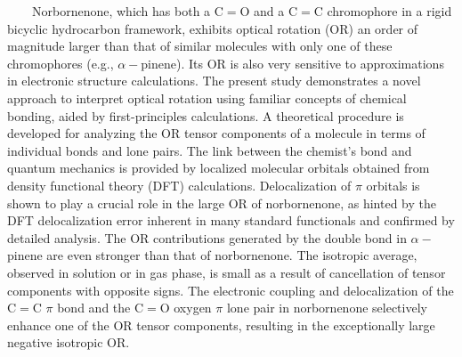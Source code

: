 \documentclass[landscape,a0b,final]{a0poster}
\newcommand{\bindent}{\ \ \ \ }
\newenvironment{poster}{
  \begin{center}
  \begin{minipage}[c]{0.98\textwidth}
}{
  \end{minipage} 
  \end{center}
}
\newcommand{\pbox}[4]{
\psshadowbox[#3]{
\begin{minipage}[t][#2][t]{#1}
#4
\end{minipage}
}}
\begin{document}
\begin{poster}
\begin{multicols}{3}
\begin{center}\pbox{0.8\columnwidth}{}{linewidth=2mm,framearc=0.3,linecolor=ubblue,fillstyle=gradient,gradangle=0,gradbegin=white,gradend=ubgray,gradmidpoint=1.0,framesep=1em}{\begin{center} \Large \color{ubblue}{\bf{Abstract}}\end{center}}\end{center} %
\vspace{0.25cm}
\large \bindent Norbornenone, which has both a C$=$O and a C$=$C chromophore in a rigid bicyclic hydrocarbon framework,
exhibits optical rotation (OR) an order of magnitude larger than that of similar molecules with only one of these chromophores
(e.g., $\alpha-$pinene). Its OR is also very sensitive to approximations in electronic structure calculations. The present study
demonstrates a novel approach to interpret optical rotation using familiar concepts of chemical bonding, aided by first-principles
calculations. A theoretical procedure is developed for analyzing the OR tensor components of a molecule in terms of individual
bonds and lone pairs. The link between the chemist’s bond and quantum mechanics is provided by localized molecular orbitals
obtained from density functional theory (DFT) calculations. Delocalization of $\pi$ orbitals is shown to play a crucial role in the
large OR of norbornenone, as hinted by the DFT delocalization error inherent in many standard functionals and confirmed by
detailed analysis. The OR contributions generated by the double bond in $\alpha-$pinene are even stronger than that of norbornenone.
The isotropic average, observed in solution or in gas phase, is small as a result of cancellation of tensor components with opposite
signs. The electronic coupling and delocalization of the C$=$C $\pi$ bond and the C$=$O oxygen $\pi$ lone pair in norbornenone
selectively enhance one of the OR tensor components, resulting in the exceptionally large negative isotropic OR.

\vspace{0.25cm}
\begin{center}\pbox{0.8\columnwidth}{}{linewidth=2mm,framearc=0.3,linecolor=ubblue,fillstyle=gradient,gradangle=0,gradbegin=white,gradend=ubgray,gradmidpoint=1.0,framesep=1em}{\begin{center} \Large \color{ubblue}{\bf{Functional Tuning}}\end{center}}\end{center}
\vspace{0.25cm}


\end{multicols}
\end{poster}
\end{document}
